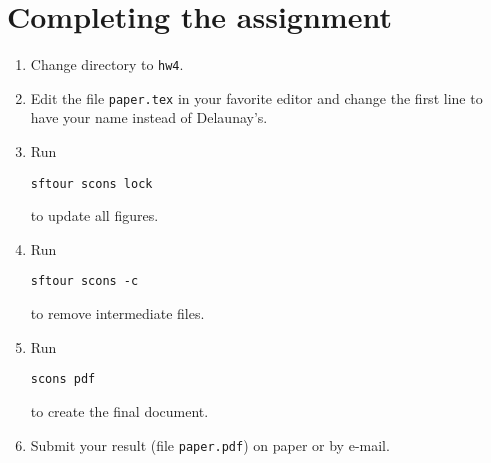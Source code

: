 \newpage

\section{Completing the assignment}

\begin{enumerate}
\item Change directory to \texttt{hw4}.
\item Edit the file \texttt{paper.tex} in your favorite editor and change the
  first line to have your name instead of Delaunay's.
\item Run
\begin{verbatim}
sftour scons lock
\end{verbatim}
to update all figures.
\item Run
\begin{verbatim}
sftour scons -c
\end{verbatim}
to remove intermediate files.
\item Run
\begin{verbatim}
scons pdf
\end{verbatim}
to create the final document.
\item Submit your result (file \texttt{paper.pdf}) on paper or by
e-mail.
\end{enumerate}




